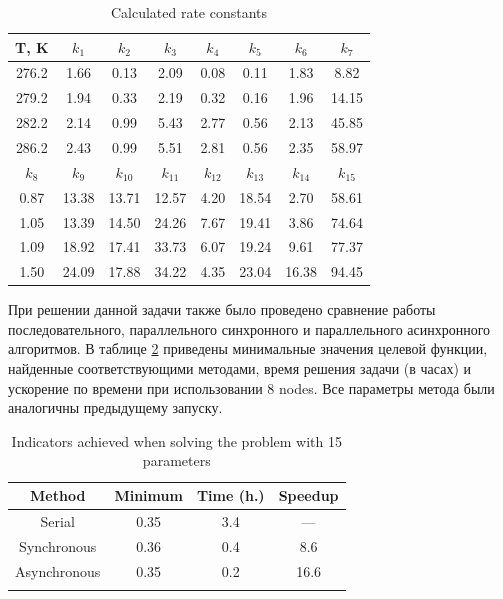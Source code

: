 \documentclass{svproc}
\begin{document}
\begin{table}
\label{table_res2}
\caption{Calculated rate constants}
\begin{center}
\begin{tabular}{cccccccc}
\hline
T, K & $k_1$ & $k_2$ & $k_3$ & $k_4$ & $k_5$ & $k_6$ & $k_7$\\
\hline\rule{0pt}{12pt}
276.2 & 1.66 & 0.13 & 2.09 & 0.08 & 0.11 & 1.83 & 8.82 \\
279.2 & 1.94 & 0.33 & 2.19 & 0.32 & 0.16 & 1.96 & 14.15\\
282.2 & 2.14 & 0.99 & 5.43 & 2.77 & 0.56 & 2.13 & 45.85\\
286.2 & 2.43 & 0.99 & 5.51 & 2.81 & 0.56  & 2.35 & 58.97\\
\hline
$k_8$ & $k_9$ & $k_{10}$ & $k_{11}$ & $k_{12}$ & $k_{13}$ & $k_{14}$ & $k_{15}$ \\
\hline\rule{0pt}{12pt}
0.87 & 13.38 & 13.71 & 12.57 & 4.20 & 18.54 & 2.70 & 58.61\\
1.05 & 13.39 & 14.50 & 24.26 & 7.67 & 19.41 & 3.86 & 74.64\\
1.09 & 18.92 & 17.41 & 33.73 & 6.07 & 19.24 & 9.61 & 77.37\\
1.50 & 24.09 & 17.88 & 34.22 & 4.35 & 23.04 & 16.38 & 94.45\\[2pt]
\hline
\end{tabular}\end{center}\end{table}

При решении данной задачи также было проведено сравнение работы последовательного, параллельного синхронного и параллельного асинхронного алгоритмов. 
В таблице \ref{table_15D} приведены минимальные значения целевой функции, найденные соответствующими методами, время решения задачи (в часах) и ускорение по времени при использовании 8 nodes. Все параметры метода были аналогичны предыдущему запуску. 

\begin{table}
\caption{Indicators achieved when solving the problem with 15 parameters}
\label{table_15D}
\begin{center}
\begin{tabular}{cccc}
\hline\noalign{\smallskip}
 Method      & Minimum  & Time (h.) & Speedup \\
\hline\noalign{\smallskip}
Serial       & 0.35   &   3.4     &  ---        \\
Synchronous  & 0.36   &   0.4     &   8.6       \\
Asynchronous & 0.35   &   0.2     &   16.6       \\
\noalign{\smallskip}\hline
\end{tabular}\end{center}\end{table}
\end{document}
